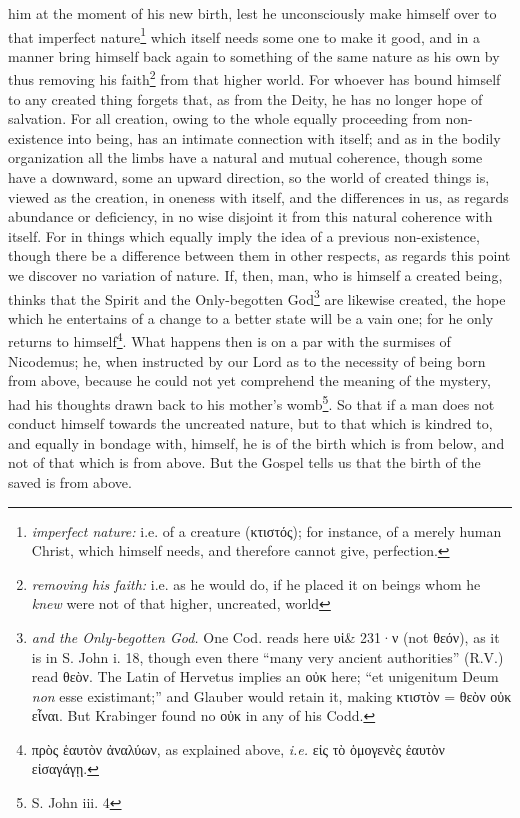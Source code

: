 him at the moment of his new birth, lest he unconsciously make himself over to that imperfect nature\footnote{\emph{imperfect nature:} i.e. of a creature (\textgreek{κτιστός}); for instance, of a merely human Christ, which himself needs, and therefore cannot give, perfection.} which itself needs some one to make it good, and in a manner bring himself back again to something of the same nature as his own by thus removing his faith\footnote{\emph{removing his faith:} i.e. as he would do, if he placed it on beings whom he \emph{knew} were not of that higher, uncreated, world} from that higher world. For whoever has bound himself to any created thing forgets that, as from the Deity, he has no longer hope of salvation. For all creation, owing to the whole equally proceeding from non-existence into being, has an intimate connection with itself; and as in the bodily organization all the limbs have a natural and mutual coherence, though some have a downward, some an upward direction, so the world of created things is, viewed as the creation, in oneness with itself, and the differences in us, as regards abundance or deficiency, in no wise disjoint it from this natural coherence with itself. For in things which equally imply the idea of a previous non-existence, though there be a difference between them in other respects, as regards this point we discover no variation of nature. If, then, man, who is himself a created being, thinks that the Spirit and the Only-begotten God\footnote{\emph{and the Only-begotten God.} One Cod. reads here \textgreek{υἱ\& 231·ν} (not \textgreek{θεόν}), as it is in S. John i. 18, though even there “many very ancient authorities” (R.V.) read \textgreek{θεὸν}. The Latin of Hervetus implies an \textgreek{οὐκ} here; “et unigenitum Deum \emph{non} esse existimant;” and Glauber would retain it, making \textgreek{κτιστὸν = θεὸν οὐκ εἶναι}. But Krabinger found no \textgreek{οὐκ} in any of his Codd.} are likewise created, the hope which he entertains of a change to a better state will be a vain one; for he only returns to himself\footnote{\textgreek{πρὸς ἑαυτὸν ἀναλύων}, as explained above, \emph{i.e.} \textgreek{εἰς τὸ ὁμογενὲς ἑαυτὸν εἰσαγάγῃ}.}. What happens then is on a par with the surmises of Nicodemus; he, when instructed by our Lord as to the necessity of being born from above, because he could not yet comprehend the meaning of the mystery, had his thoughts drawn back to his mother’s womb\footnote{S. John iii. 4}. So that if a man does not conduct himself towards the uncreated nature, but to that which is kindred to, and equally in bondage with, himself, he is of the birth which is from below, and not of that which is from above. But the Gospel tells us that the birth of the saved is from above.

